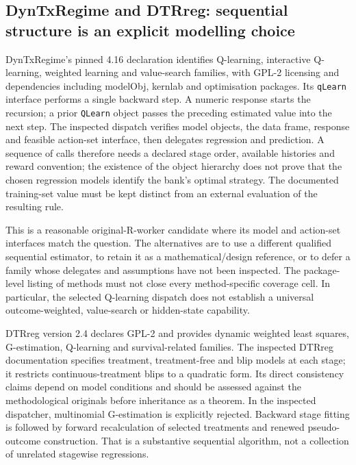 \subsection{DynTxRegime and DTRreg: sequential structure is an explicit modelling choice}
DynTxRegime's pinned 4.16 declaration identifies Q-learning, interactive Q-learning,
weighted learning and value-search families, with GPL-2 licensing and dependencies
including modelObj, kernlab and optimisation packages. Its \texttt{qLearn} interface
performs a single backward step. A numeric response starts the recursion; a prior
\texttt{QLearn} object passes the preceding estimated value into the next step.
The inspected dispatch verifies model objects, the data frame, response and feasible
action-set interface, then delegates regression and prediction. A sequence of calls
therefore needs a declared stage order, available histories and reward convention;
the existence of the object hierarchy does not prove that the chosen regression
models identify the bank's optimal strategy. The documented training-set value
must be kept distinct from an external evaluation of the resulting rule.
\citep{exec24_policiesr_dyntx}

This is a reasonable original-R-worker candidate where its model and action-set
interfaces match the question. The alternatives are to use a different qualified
sequential estimator, to retain it as a mathematical/design reference, or to defer
a family whose delegates and assumptions have not been inspected. The package-level
listing of methods must not close every method-specific coverage cell. In particular,
the selected Q-learning dispatch does not establish a universal outcome-weighted,
value-search or hidden-state capability.

DTRreg version 2.4 declares GPL-2 and provides dynamic weighted least squares,
G-estimation, Q-learning and survival-related families. The inspected DTRreg
documentation specifies treatment, treatment-free and blip models at each stage;
it restricts continuous-treatment blips to a quadratic form. Its direct consistency
claims depend on model conditions and should be assessed against the methodological
originals before inheritance as a theorem. In the inspected dispatcher, multinomial
G-estimation is explicitly rejected. Backward stage fitting is followed by forward
recalculation of selected treatments and renewed pseudo-outcome construction.
That is a substantive sequential algorithm, not a collection of unrelated stagewise
regressions.\citep{exec24_policiesr_dtrreg}

